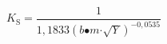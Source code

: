 \begin{equation}
K_{\mathrm{S}}\mathrm{=}\frac{\mathrm{1}}{\mathrm{1,1833}{\left(b\mathrm{\bullet }m\mathrm{\cdot }\sqrt{Y}\right)}^{\mathrm{-}\mathrm{0,0535}}}
\end{equation}